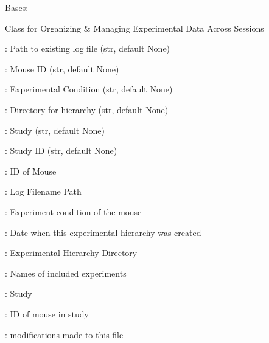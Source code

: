 \documentclass[letterpaper,10pt,english]{sphinxmanual}
\begin{document}

\begin{fulllineitems}
\label{\detokenize{Organization:Organization.Mouse}}
\pysigstartsignatures
{}
\pysigstopsignatures
\sphinxAtStartPar
Bases: 

\sphinxAtStartPar
Class for Organizing \& Managing Experimental Data Across Sessions
\begin{description}
\begin{DUlineblock}{0em}
\item[]  : Path to existing log file (str, default None)
\item[]  : Mouse ID (str, default None)
\item[]  : Experimental Condition (str, default None)
\item[]  : Directory for hierarchy (str, default None)
\item[]  : Study (str, default None)
\item[]  : Study ID (str, default None)
\end{DUlineblock}

\begin{DUlineblock}{0em}
\item[]  : ID of Mouse
\item[]  : Log Filename Path
\item[]  : Experiment condition of the mouse
\item[]  : Date when this experimental hierarchy was created
\end{DUlineblock}

\begin{DUlineblock}{0em}
\item[]  : Experimental Hierarchy Directory
\item[]  : Names of included experiments
\item[]  : Study
\item[]  : ID of mouse in study
\item[]  : modifications made to this file
\end{DUlineblock}


\end{description}
\end{fulllineitems}
\end{document}
